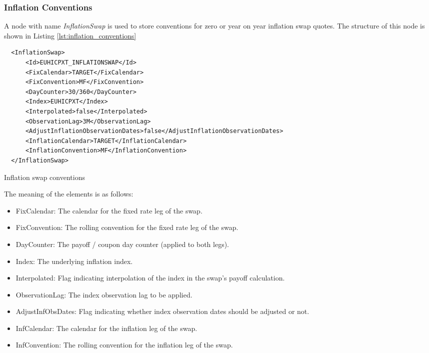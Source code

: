 \subsubsection{Inflation Conventions}

A node with name \emph{InflationSwap} is used to store conventions for zero or year on year inflation swap quotes. The
structure of this node is shown in Listing \ref{lst:inflation_conventions}

\begin{listing}[H]
\begin{verbatim}
  <InflationSwap>
      <Id>EUHICPXT_INFLATIONSWAP</Id>
      <FixCalendar>TARGET</FixCalendar>
      <FixConvention>MF</FixConvention>
      <DayCounter>30/360</DayCounter>
      <Index>EUHICPXT</Index>
      <Interpolated>false</Interpolated>
      <ObservationLag>3M</ObservationLag>
      <AdjustInflationObservationDates>false</AdjustInflationObservationDates>
      <InflationCalendar>TARGET</InflationCalendar>
      <InflationConvention>MF</InflationConvention>
  </InflationSwap>
\end{verbatim}
\caption{Inflation swap conventions}
\label{lst:inflation_conventions}
\end{listing}

The meaning of the elements is as follows:

\begin{itemize}
\item FixCalendar: The calendar for the fixed rate leg of the swap.
\item FixConvention: The rolling convention for the fixed rate leg of the swap.
\item DayCounter: The payoff / coupon day counter (applied to both legs).
\item Index: The underlying inflation index.
\item Interpolated: Flag indicating interpolation of the index in the swap's payoff calculation.
\item ObservationLag: The index observation lag to be applied.
\item AdjustInfObsDates: Flag indicating whether index observation dates should be adjusted or not.
\item InfCalendar: The calendar for the inflation leg of the swap.
\item InfConvention: The rolling convention for the inflation leg of the swap.
\end{itemize}

